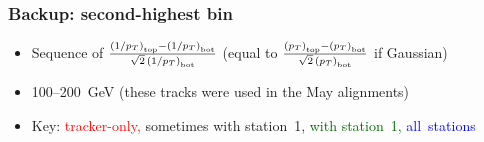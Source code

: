 \documentclass[compress]{beamer}
\begin{document}
\begin{frame}
\frametitle{Backup: second-highest bin}
\begin{itemize}
\item Sequence of $\frac{\left(1/p_T\right)_{\mbox{\tiny top}} - \left(1/p_T\right)_{\mbox{\tiny bot}}}{\sqrt{2} \, \left(1/p_T\right)_{\mbox{\tiny bot}}}$ (equal to $\frac{\left(p_T\right)_{\mbox{\tiny top}} - \left(p_T\right)_{\mbox{\tiny bot}}}{\sqrt{2} \, \left(p_T\right)_{\mbox{\tiny bot}}}$ if Gaussian)
\item 100--200~GeV (these tracks were used in the May alignments)
\item Key: \textcolor{red}{tracker-only,} sometimes with station~1, \textcolor{darkgreen}{with station~1,} \mbox{\textcolor{blue}{all stations}\hspace{-1 cm}}
\end{itemize}

\mbox{ } \hfill {} \hfill \mbox{ }


\end{frame}
\end{document}
